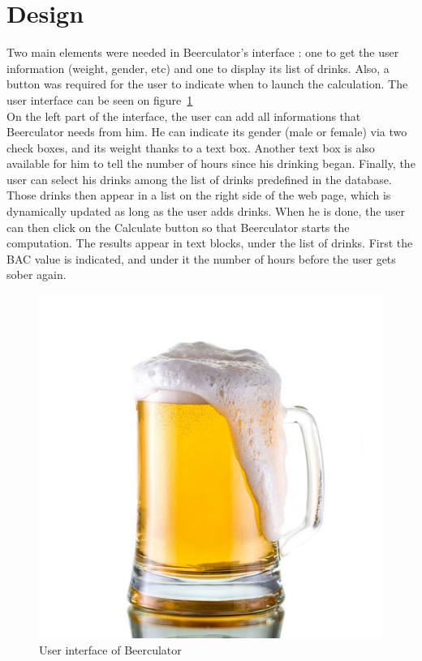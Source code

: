 \section{Design}
\label{sec:design}

Two main elements were needed in Beerculator's interface : one to get the user information (weight, gender, etc) and one to display its list of drinks. Also, a button was required for the user to indicate when to launch the calculation. The user interface can be seen on {\sc figure}~\ref{fig:ui}\\

On the left part of the interface, the user can add all informations that Beerculator needs from him. He can indicate its gender (male or female) via two check boxes, and its weight thanks to a text box. Another text box is also available for him to tell the number of hours since his drinking began. Finally, the user can select his drinks among the list of drinks predefined in the database. \\

Those drinks then appear in a list on the right side of the web page, which is dynamically updated as long as the user adds drinks. When he is done, the user can then click on the \guillemotleft Calculate \guillemotright button so that Beerculator starts the computation. The results appear in text blocks, under the list of drinks. First the BAC value is indicated, and under it the number of hours before the user gets sober again.\\

\begin{figure}[H]
\begin{centering}
   \includegraphics[scale=0.3]{./figures/beer.jpg}
   \caption{User interface of Beerculator}
   \label{fig:ui}
   \end{centering}
\end{figure}